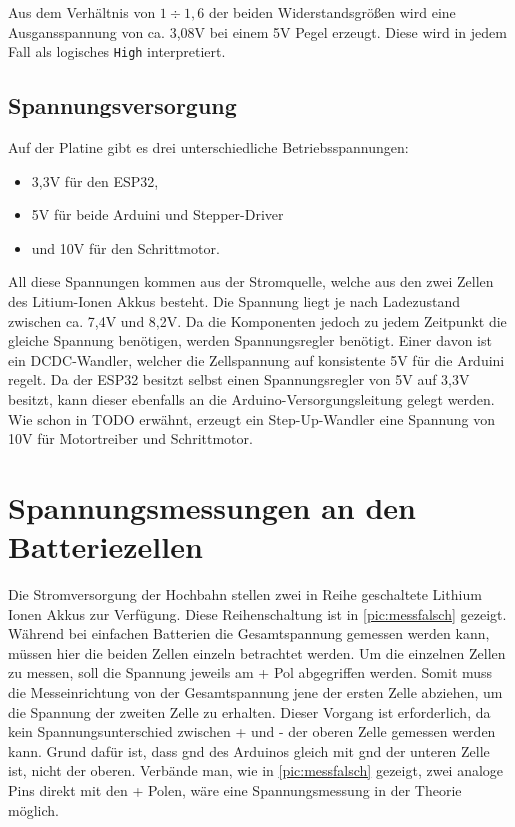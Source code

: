 Aus dem Verhältnis von $1 \div 1,6$ der beiden Widerstandsgrößen wird eine Ausgansspannung von ca. 3,08V bei einem 5V Pegel erzeugt. Diese wird in jedem Fall als logisches \texttt{High} interpretiert.

\subsection{Spannungsversorgung}
Auf der Platine gibt es drei unterschiedliche Betriebsspannungen: 
\begin{center}
	\begin{itemize}
		\item 3,3V für den ESP32,
		\item 5V für beide Arduini und Stepper-Driver
		\item und 10V für den Schrittmotor.
	\end{itemize}
\end{center}
All diese Spannungen kommen aus der Stromquelle, welche aus den zwei Zellen des Litium-Ionen Akkus besteht. Die Spannung liegt je nach Ladezustand zwischen ca. 7,4V und 8,2V. Da die Komponenten jedoch zu jedem Zeitpunkt die gleiche Spannung benötigen, werden Spannungsregler benötigt. 
Einer davon ist ein DCDC-Wandler, welcher die Zellspannung auf konsistente 5V für die Arduini regelt. Da der ESP32 besitzt selbst einen Spannungsregler von 5V auf 3,3V besitzt, kann dieser ebenfalls an die Arduino-Versorgungsleitung gelegt werden. Wie schon in TODO erwähnt, erzeugt ein Step-Up-Wandler eine Spannung von 10V für Motortreiber und Schrittmotor. 

\section{Spannungsmessungen an den Batteriezellen}
\label{sec:mess}
Die Stromversorgung der Hochbahn stellen zwei in Reihe geschaltete Lithium Ionen Akkus zur Verfügung. Diese Reihenschaltung ist in \autoref{pic:messfalsch} gezeigt. Während bei einfachen Batterien die Gesamtspannung gemessen werden kann, müssen hier die beiden Zellen einzeln betrachtet werden.
Um die einzelnen Zellen zu messen, soll die Spannung jeweils am + Pol abgegriffen werden. Somit muss die Messeinrichtung von der Gesamtspannung jene der ersten Zelle abziehen, um die Spannung der zweiten Zelle zu erhalten. Dieser Vorgang ist erforderlich, da kein Spannungsunterschied zwischen + und - der oberen Zelle gemessen werden kann. Grund dafür ist, dass \gls{gnd} des Arduinos gleich mit \gls{gnd} der unteren Zelle ist, nicht der oberen.
Verbände man, wie in \autoref{pic:messfalsch} gezeigt, zwei analoge Pins direkt mit den + Polen, wäre eine Spannungsmessung in der Theorie möglich.

